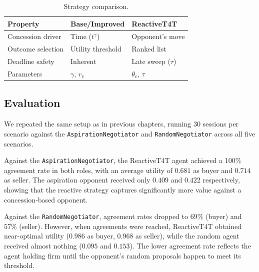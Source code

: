 \documentclass[../report.tex]{subfiles}
\begin{document}
\begin{table}[h!]
    \centering
    \begin{tabularx}{\columnwidth}{lp{2.1cm}X}
        \toprule
        \textbf{Property} & \textbf{Base/Improved} & \textbf{ReactiveT4T} \\
        \midrule
        Concession driver & Time ($t^\gamma$) & Opponent's move \\
        Outcome selection & Utility threshold & Ranked list \\
        Deadline safety & Inherent & Late sweep ($\tau$) \\
        Parameters & $\gamma$, $r_v$ & $\theta_c$, $\tau$ \\
        \bottomrule
    \end{tabularx}
    \caption{Strategy comparison.}
    \label{tab:strategy_comparison}
\end{table}

\subsection{Evaluation}

We repeated the same setup as in previous chapters, running 30 sessions per scenario against the \texttt{AspirationNegotiator} and \texttt{RandomNegotiator} across all five scenarios.

Against the \texttt{AspirationNegotiator}, the ReactiveT4T agent achieved a 100\% agreement rate in both roles, with an average utility of $0.681$ as buyer and $0.714$ as seller. The aspiration opponent received only $0.409$ and $0.422$ respectively, showing that the reactive strategy captures significantly more value against a concession-based opponent.

Against the \texttt{RandomNegotiator}, agreement rates dropped to $69\%$ (buyer) and $57\%$ (seller). However, when agreements were reached, ReactiveT4T obtained near-optimal utility ($0.986$ as buyer, $0.968$ as seller), while the random agent received almost nothing ($0.095$ and $0.153$). The lower agreement rate reflects the agent holding firm until the opponent's random proposals happen to meet its threshold.
\end{document}
